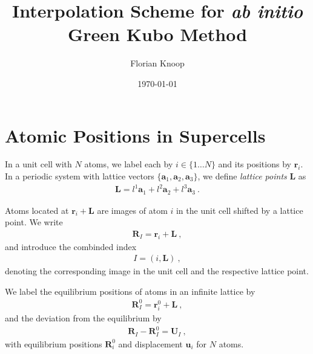 \documentclass[nofootinbib,preprintnumbers,amsmath,amssymb,twocolumn]{revtex4-1}
\renewcommand{\b}[1]{\boldsymbol{#1}}
\newcommand{\nid}{\noindent}
\begin{document}

\title{Interpolation Scheme for \emph{ab initio} Green Kubo Method}
\author{Florian Knoop}


\date{\today}
\maketitle

\section{Atomic Positions in Supercells}
\nid
In a unit cell with $N$ atoms, we label each by 
\mbox{$i \in \{1 \ldots N \}$} 
and its positions by 
$\b r_i$. 
In a periodic system with lattice vectors 
$\{ \b a_1, \b a_2, \b a_3 \}$, we define \emph{lattice points} $\b L$ as
\begin{align}
	\b L = l^1 \b a_1 + l^2 \b a_2 + l^3 \b a_3~.
\end{align}

\nid
Atoms located at $\b r_i + \b L$ are images of atom $i$ in the unit cell shifted by a 
lattice point. We write
\begin{align}
\b R_I = \b r_i + \b L ~,
\label{def:R_I}
\end{align}
and introduce the combinded index 
\begin{align}
	I = (i, \b L)~,
	\label{def:I}
\end{align}
denoting the corresponding image in 
the unit cell and the respective lattice point.

We label the equilibrium positions of atoms in an infinite lattice by
\begin{align}
	\b R_I^0 = \b r_i^0 + \b L ~,
	\label{def:R_I0}
\end{align}
and the deviation from the equilibrium by
\begin{align}
	\b R_I - \b R_I^0 = \b U_I ~,
\label{def:u_i}
\end{align}
with equilibrium positions $\b R_i^0$ and displacement $\b u_i$ for $N$ 
atoms.
\end{document}
